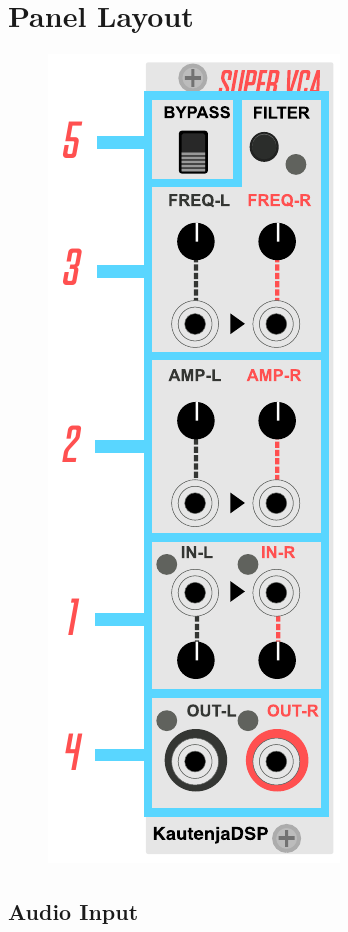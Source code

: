 \documentclass[12pt,letter]{article}
\begin{document}

\clearpage
\section{Panel Layout}

\begin{figure}[!htp]
\centering
\includegraphics{img/Interface}
\end{figure}

\subsection{Audio Input}
\end{document}
